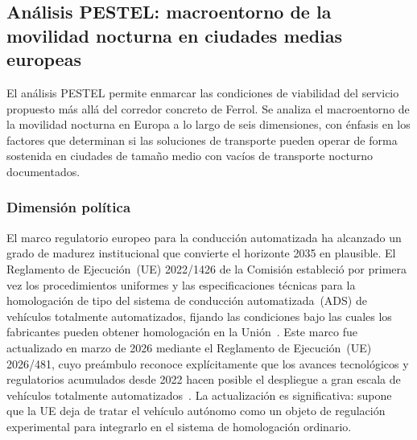 

\subsection{Análisis PESTEL: macroentorno de la movilidad nocturna en ciudades medias europeas}
\label{sec:pestel}

El análisis PESTEL permite enmarcar las condiciones de viabilidad del
servicio propuesto más allá del corredor concreto de Ferrol. Se analiza
el macroentorno de la movilidad nocturna en Europa a lo largo de seis dimensiones, con énfasis en los factores que determinan si las soluciones de transporte pueden operar de forma sostenida en ciudades de tamaño medio con vacíos de transporte nocturno documentados.

\subsubsection{Dimensión política}
\label{sec:pestel-politica}

El marco regulatorio europeo para la conducción automatizada ha alcanzado
un grado de madurez institucional que convierte el horizonte 2035 en
plausible. El Reglamento de Ejecución~(UE) 2022/1426 de la Comisión
estableció por primera vez los procedimientos uniformes y las
especificaciones técnicas para la homologación de tipo del sistema de
conducción automatizada~(ADS) de vehículos totalmente automatizados,
fijando las condiciones bajo las cuales los fabricantes pueden obtener
homologación en la Unión~\parencite{RegUE20221426}. Este marco fue
actualizado en marzo de 2026 mediante el Reglamento de Ejecución~(UE)
2026/481, cuyo preámbulo reconoce explícitamente que los avances
tecnológicos y regulatorios acumulados desde 2022 hacen posible el
despliegue a gran escala de vehículos totalmente
automatizados~\parencite{RegUE20262026481}. La actualización es
significativa: supone que la UE deja de tratar el vehículo autónomo como
un objeto de regulación experimental para integrarlo en el sistema de
homologación ordinario.

